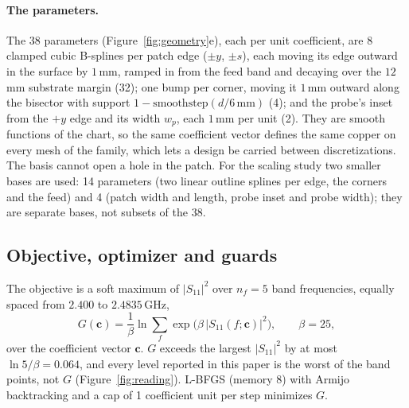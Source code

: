 \documentclass{anvil-paper}
\begin{document}
\paragraph{The parameters.}
The 38 parameters (Figure~\ref{fig:geometry}e), each per unit coefficient, are $8$ clamped cubic
B-splines per patch edge ($\pm y$, $\pm s$), each moving its edge outward in
the surface by $1$\,mm, ramped in from the feed band and decaying over the
$12$\,mm substrate margin (32); one bump per corner, moving it $1$\,mm
outward along the bisector with support $1 - \mathrm{smoothstep}(d/6\,\mathrm{mm})$
(4); and the probe's inset from the $+y$ edge and its width $w_p$, each
$1$\,mm per unit (2). They
are smooth functions of the chart, so the same coefficient vector defines
the same copper on every mesh of the family, which lets a design be carried
between discretizations. The basis cannot open a hole in the patch. For the
scaling study two smaller bases are used: 14 parameters (two linear outline
splines per edge, the corners and the feed) and 4 (patch width and length,
probe inset and probe width); they are separate bases, not subsets of the
38.

\subsection{Objective, optimizer and guards}
\label{sec:objective}

The objective is a soft maximum of $|S_{11}|^2$ over $n_f = 5$ band
frequencies, equally spaced from $2.400$ to $2.4835$\,GHz,
\begin{equation}
  G(\mathbf{c}) = \frac{1}{\beta}\ln \sum_{f} \exp\!\big(\beta\,|S_{11}(f;\mathbf{c})|^2\big),
  \qquad \beta = 25,
  \label{eq:objective}
\end{equation}
over the coefficient vector $\mathbf{c}$. $G$ exceeds the largest
$|S_{11}|^2$ by at most $\ln 5/\beta = 0.064$, and every level reported in
this paper is the worst of the band points, not $G$
(Figure~\ref{fig:reading}). L-BFGS (memory 8) with
Armijo backtracking and a cap of 1 coefficient unit per step minimizes $G$.
\end{document}
